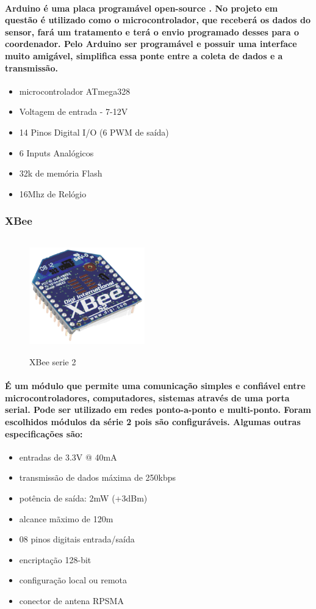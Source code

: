 \paragraph{
Arduino é uma placa programável open-source . No projeto em questão é utilizado como o microcontrolador, que receberá os dados do sensor, fará um tratamento e terá o envio programado desses para o coordenador. Pelo Arduino ser programável e possuir uma interface muito amigável, simplifica essa ponte entre a coleta de dados e a transmissão.
}
\begin{itemize}
\item{microcontrolador ATmega328}
\item{Voltagem de entrada - 7-12V}
\item{14 Pinos Digital I/O (6 PWM de saída)}
\item{6 Inputs Analógicos}
\item{32k de memória Flash}
\item{16Mhz de Relógio}
\end{itemize}

\subsubsection{XBee}
\begin{figure}[H]
\begin{center}
\includegraphics[width=5cm,height=5cm,keepaspectratio]{figuras/xbee_serie2.png}
\caption{\label{fig:xbee} XBee serie 2}
\end{center}
\end{figure}
\paragraph{
É um módulo que permite uma comunicação simples e confiável entre microcontroladores, computadores, sistemas através de uma porta serial. Pode ser utilizado em redes ponto-a-ponto e multi-ponto. Foram escolhidos módulos da série 2 pois são configuráveis.
Algumas outras especificações são:
}
\begin{itemize}
\item{entradas de 3.3V @ 40mA}
\item{transmissão de dados máxima de 250kbps}
\item{potência de saída: 2mW (+3dBm)}
\item{alcance mãximo de 120m}
\item{08 pinos digitais entrada/saída}
\item{encriptação 128-bit}
\item{configuração local ou remota}
\item{conector de antena RPSMA}
\end{itemize}

